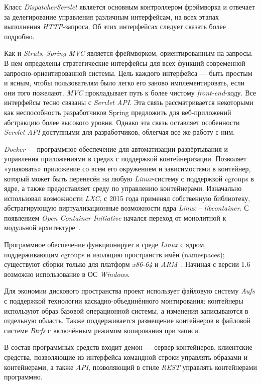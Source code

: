 Класс \textit{DispatcherServlet} является основным контроллером фрэймворка и отвечает за делегирование управления различным интерфейсам, на всех этапах выполнения \textit{HTTP}-запроса. Об этих интерфейсах следует сказать более подробно.

Как и \textit{Struts}, \textit{Spring MVC} является фреймворком, ориентированным на запросы. В нем определены стратегические интерфейсы для всех функций современной запросно-ориентированной системы. Цель каждого интерфейса — быть простым и ясным, чтобы пользователям было легко его заново имплементировать, если они того пожелают. \textit{MVC} прокладывает путь к более чистому \textit{front-end}-коду. Все интерфейсы тесно связаны с \textit{Servlet API}. Эта связь рассматривается некоторыми как неспособность разработчиков Spring предложить для веб-приложений абстракцию более высокого уровня. Однако эта связь оставляет особенности \textit{Servlet API} доступными для разработчиков, облегчая все же работу с ним. 

\textit{Docker} — программное обеспечение для автоматизации развёртывания и управления приложениями в средах с поддержкой контейнеризации. Позволяет «упаковать» приложение со всем его окружением и зависимостями в контейнер, который может быть перенесён на любую \textit{Linux}-систему с поддержкой cgroups в ядре, а также предоставляет среду по управлению контейнерами. Изначально использовал возможности \textit{LXC}, с 2015 года применял собственную библиотеку, абстрагирующую виртуализационные возможности ядра \textit{Linux} -- \textit{libcontainer}. С появлением \textit{​Open Container Initiative} начался переход от монолитной к модульной архитектуре~\cite{docker}.

Программное обеспечение функционирует в среде \textit{Linux} с ядром, поддерживающим cgroups и изоляцию пространств имён (namespaces); существуют сборки только для платформ \textit{x86-64} и \textit{ARM}~\cite{docker}. Начиная с версии 1.6 возможно использование в ОС \textit{Windows}.

Для экономии дискового пространства проект использует файловую систему \textit{Aufs} с поддержкой технологии каскадно-объединённого монтирования: контейнеры используют образ базовой операционной системы, а изменения записываются в отдельную область. Также поддерживается размещение контейнеров в файловой системе \textit{Btrfs} с включённым режимом копирования при записи.

В состав программных средств входит демон — сервер контейнеров, клиентские средства, позволяющие из интерфейса командной строки управлять образами и контейнерами, а также \textit{API}, позволяющий в стиле \textit{REST} управлять контейнерами программно.

